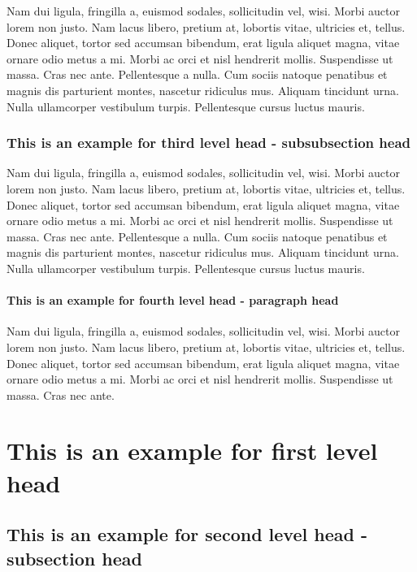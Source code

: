 \documentclass[numbers,webpdf]{ima-authoring-template}%
\theoremstyle{thmstyletwo}%
\numberwithin{equation}{section}
\begin{document}
Nam dui ligula, fringilla a, euismod sodales, sollicitudin vel, wisi. Morbi auctor lorem non justo. Nam lacus libero,
pretium at, lobortis vitae, ultricies et, tellus. Donec aliquet, tortor sed accumsan bibendum, erat ligula aliquet magna,
vitae ornare odio metus a mi. Morbi ac orci et nisl hendrerit mollis. Suspendisse ut massa. Cras nec ante. Pellentesque
a nulla. Cum sociis natoque penatibus et magnis dis parturient montes, nascetur ridiculus mus. Aliquam tincidunt
urna. Nulla ullamcorper vestibulum turpis. Pellentesque cursus luctus mauris.
\subsubsection{This is an example for third level head - subsubsection head}\label{subsubsec1}

Nam dui ligula, fringilla a, euismod sodales, sollicitudin vel, wisi. Morbi auctor lorem non justo. Nam lacus libero,
pretium at, lobortis vitae, ultricies et, tellus. Donec aliquet, tortor sed accumsan bibendum, erat ligula aliquet magna,
vitae ornare odio metus a mi. Morbi ac orci et nisl hendrerit mollis. Suspendisse ut massa. Cras nec ante. Pellentesque
a nulla. Cum sociis natoque penatibus et magnis dis parturient montes, nascetur ridiculus mus. Aliquam tincidunt
urna. Nulla ullamcorper vestibulum turpis. Pellentesque cursus luctus mauris.

\paragraph{This is an example for fourth level head - paragraph head}

Nam dui ligula, fringilla a, euismod sodales, sollicitudin vel, wisi. Morbi auctor lorem non justo. Nam lacus libero,
pretium at, lobortis vitae, ultricies et, tellus. Donec aliquet, tortor sed accumsan bibendum, erat ligula aliquet magna,
vitae ornare odio metus a mi. Morbi ac orci et nisl hendrerit mollis. Suspendisse ut massa. Cras nec ante.

\section{This is an example for first level head}\label{sec3}

\subsection{This is an example for second level head - subsection head}\label{subsec2}
\end{document}
